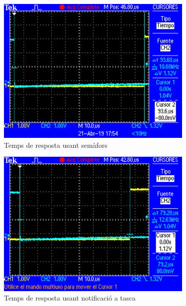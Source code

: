 \begin{figure}
 \centering
 \includegraphics[width=0.85\textwidth, keepaspectratio]{imatges/IRQtoSemaphore.png}
 \caption{Temps de resposta usant semàfors}
 \label{fig:IRQtoTaskTime_Semaphhore}
\end{figure}

\begin{figure}
 \centering
 \includegraphics[width=0.85\textwidth, keepaspectratio]{imatges/IRQtoDirectTask.png}
 \caption{Temps de resposta usant notificació a tasca}
 \label{fig:IRQtoTaskTime_Direct}
\end{figure}

